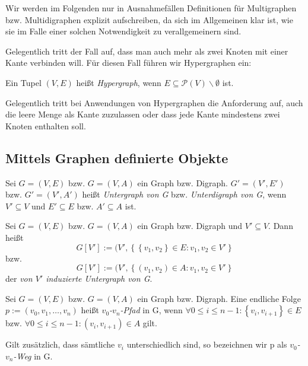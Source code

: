 \documentclass[10pt]{scrbook}
\begin{document}
Wir werden im Folgenden nur in Ausnahmefällen Definitionen für Multigraphen bzw. Multidigraphen explizit aufschreiben, da sich im Allgemeinen klar ist, wie sie im Falle einer solchen Notwendigkeit zu verallgemeinern sind.

Gelegentlich tritt der Fall auf, dass man auch mehr als zwei Knoten mit einer Kante verbinden will. Für diesen Fall führen wir Hypergraphen ein:

\begin{Def}
Ein Tupel $(V, E)$ heißt \emph{Hypergraph}, wenn $E\subseteq \mathcal{P}(V)\backslash \emptyset$ ist.
\end{Def}

\begin{Bem}
Gelegentlich tritt bei Anwendungen von Hypergraphen die Anforderung auf, auch die leere Menge als Kante zuzulassen oder dass jede Kante mindestens zwei Knoten enthalten soll.
\end{Bem}

\subsection{Mittels Graphen definierte Objekte}

\begin{Def}
Sei $G=(V, E)$ bzw. $G=(V, A)$ ein Graph bzw. Digraph. $G'=(V', E')$ bzw. $G'=(V', A')$ heißt \emph{Untergraph von G} bzw. \emph{Unterdigraph von G}, wenn $V'\subseteq V$ und  $E'\subseteq E$ bzw. $A'\subseteq A$ ist.
\end{Def}

\begin{Def}
Sei $G=(V, E)$ bzw. $G=(V, A)$ ein Graph bzw. Digraph und $V'\subseteq V$. Dann heißt
\begin{displaymath}
G\left[V'\right] := (V', \left\{\left\{v_1, v_2\right\}\in E: v_1, v_2\in V'\right\}
\end{displaymath}
bzw.
\begin{displaymath}
G\left[V'\right] := (V', \left\{\left(v_1, v_2\right)\in A: v_1, v_2\in V'\right\}
\end{displaymath}
der \emph{von $V'$ induzierte Untergraph von G}.
\end{Def}

\begin{Def}
Sei $G=(V, E)$ bzw. $G=(V, A)$ ein Graph bzw. Digraph. Eine endliche Folge $p:=\left(v_0, v_1, \ldots, v_n\right)$ heißt \emph{$v_0$-$v_n$-Pfad} in G, wenn $\forall 0\leq i \leq n-1:  \left\{v_i, v_{i+1}\right\}\in E$ bzw. $\forall 0\leq i \leq n-1:  \left(v_i, v_{i+1}\right)\in A$ gilt.

Gilt zusätzlich, dass sämtliche $v_i$ unterschiedlich sind, so bezeichnen wir p als \emph{$v_0$-$v_n$-Weg} in G.
\end{Def}
\end{document}
